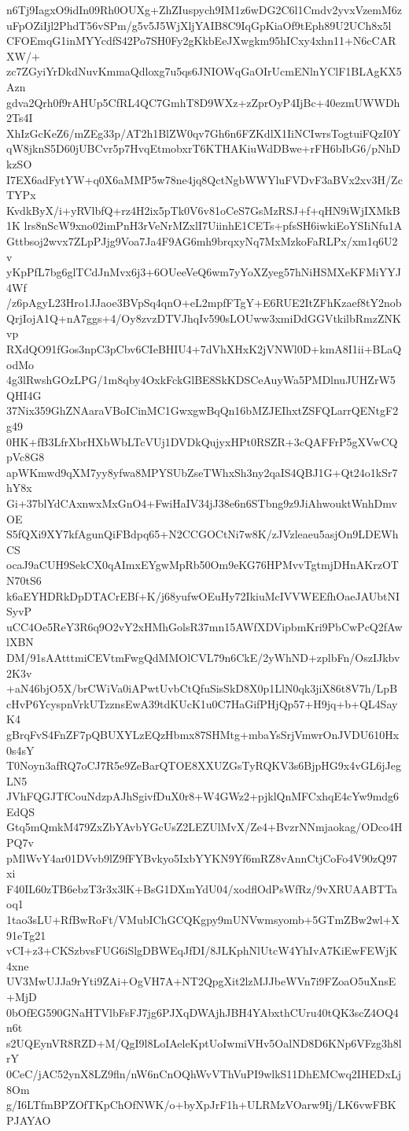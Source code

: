 n6Tj9IagxO9idIn09Rh0OUXg+ZhZIuspych9IM1z6wDG2C6l1Cmdv2yvxVzemM6z
uFpOZiIjl2PhdT56vSPm/g5v5J5WjXljYAIB8C9IqGpKiaOf9tEph89U2UCh8x5l
CFOEmqG1inMYYcdfS42Po7SH0Fy2gKkbEeJXwgkm95hICxy4xhn11+N6cCARXW/+
zc7ZGyiYrDkdNuvKmmaQdloxg7u5qs6JNIOWqGaOIrUcmENlnYClF1BLAgKX5Azn
gdva2Qrh0f9rAHUp5CfRL4QC7GmhT8D9WXz+zZprOyP4IjBc+40ezmUWWDh2Ts4I
XhIzGcKeZ6/mZEg33p/AT2h1BlZW0qv7Gh6n6FZKdlX1IiNCIwrsTogtuiFQzI0Y
qW8jknS5D60jUBCvr5p7HvqEtmobxrT6KTHAKiuWdDBwe+rFH6bIbG6/pNhDkzSO
I7EX6adFytYW+q0X6aMMP5w78ne4jq8QctNgbWWYluFVDvF3aBVx2xv3H/ZcTYPx
KvdkByX/i+yRVlbfQ+rz4H2ix5pTk0V6v81oCeS7GsMzRSJ+f+qHN9iWjIXMkB1K
lrs8nScW9xno02imPnH3rVeNrMZxlI7UiinhE1CETs+pfsSH6iwkiEoYSIiNfu1A
Gttbsoj2wvx7ZLpPJjg9Voa7Ja4F9AG6mh9brqxyNq7MxMzkoFaRLPx/xm1q6U2v
yKpPfL7bg6glTCdJnMvx6j3+6OUeeVeQ6wm7yYoXZyeg57hNiHSMXeKFMiYYJ4Wf
/z6pAgyL23Hro1JJaoe3BVpSq4qnO+eL2mpfFTgY+E6RUE2ItZFhKzaef8tY2nob
QrjIojA1Q+nA7ggs+4/Oy8zvzDTVJhqIv590sLOUww3xmiDdGGVtkilbRmzZNKvp
RXdQO91fGos3npC3pCbv6CIeBHIU4+7dVhXHxK2jVNWl0D+kmA8I1ii+BLaQodMo
4g3lRwshGOzLPG/1m8qby4OxkFckGlBE8SkKDSCeAuyWa5PMDlnuJUHZrW5QHI4G
37Nix359GhZNAaraVBoICinMC1GwxgwBqQn16bMZJEIhxtZSFQLarrQENtgF2g49
0HK+fB3LfrXbrHXbWbLTcVUj1DVDkQujyxHPt0RSZR+3cQAFFrP5gXVwCQpVc8G8
apWKmwd9qXM7yy8yfwa8MPYSUbZseTWhxSh3ny2qaIS4QBJ1G+Qt24o1kSr7hY8x
Gi+37blYdCAxnwxMxGnO4+FwiHaIV34jJ38e6n6STbng9z9JiAhwouktWnhDmvOE
S5fQXi9XY7kfAgunQiFBdpq65+N2CCGOCtNi7w8K/zJVzleaeu5asjOn9LDEWhCS
ocaJ9aCUH9SekCX0qAImxEYgwMpRb50Om9eKG76HPMvvTgtmjDHnAKrzOTN70tS6
k6aEYHDRkDpDTACrEBf+K/j68yufwOEuHy72IkiuMcIVVWEEfhOaeJAUbtNISyvP
uCC4Oe5ReY3R6q9O2vY2xHMhGolsR37mn15AWfXDVipbmKri9PbCwPcQ2fAwlXBN
DM/91sAAtttmiCEVtmFwgQdMMOlCVL79n6CkE/2yWhND+zplbFn/OszIJkbv2K3v
+aN46bjO5X/brCWiVa0iAPwtUvbCtQfuSisSkD8X0p1LlN0qk3jiX86t8V7h/LpB
cHvP6YcyspnVrkUTzznsEwA39tdKUcK1u0C7HaGifPHjQp57+H9jq+b+QL4SayK4
gBrqFvS4FnZF7pQBUXYLzEQzHbmx87SHMtg+mbaYsSrjVmwrOnJVDU610Hx0s4sY
T0Noyn3afRQ7oCJ7R5e9ZeBarQTOE8XXUZGsTyRQKV3s6BjpHG9x4vGL6jJegLN5
JVhFQGJTfCouNdzpAJhSgivfDuX0r8+W4GWz2+pjklQnMFCxhqE4cYw9mdg6EdQS
Gtq5mQmkM479ZxZbYAvbYGcUsZ2LEZUlMvX/Ze4+BvzrNNmjaokag/ODco4HPQ7v
pMlWvY4ar01DVvb9lZ9fFYBvkyo5IxbYYKN9Yf6mRZ8vAnnCtjCoFo4V90zQ97xi
F40IL60zTB6ebzT3r3x3lK+BsG1DXmYdU04/xodflOdPsWfRz/9vXRUAABTTaoq1
1tao3sLU+RfBwRoFt/VMubIChGCQKgpy9mUNVwmsyomb+5GTmZBw2wl+X91eTg21
vCI+z3+CKSzbvsFUG6iSlgDBWEqJfDI/8JLKphNlUtcW4YhIvA7KiEwFEWjK4xne
UV3MwUJJa9rYti9ZAi+OgVH7A+NT2QpgXit2lzMJJbeWVn7i9FZoaO5uXnsE+MjD
0bOfEG590GNaHTVlbFsFJ7jg6PJXqDWAjhJBH4YAbxthCUru40tQK3scZ4OQ4n6t
s2UQEynVR8RZD+M/QgI9l8LoIAeleKptUoIwmiVHv5OalND8D6KNp6VFzg3h8lrY
0CeC/jAC52ynX8LZ9fln/nW6nCnOQhWvVThVuPI9wlkS11DhEMCwq2IHEDxLj8Om
g/I6LTfmBPZOfTKpChOfNWK/o+byXpJrF1h+ULRMzVOarw9Ij/LK6vwFBKPJAYAO
